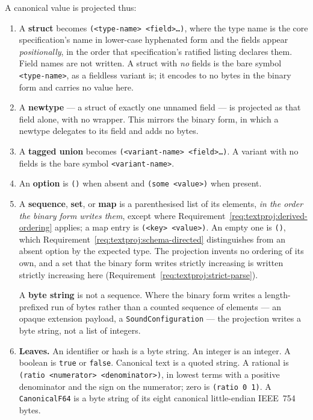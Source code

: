 \documentclass[11pt,letterpaper]{report}
\newcounter{requirement}[chapter]
\begin{document}
\begin{requirement}
  \label{req:textproj:value-projection}
  A canonical value is projected thus:

  \begin{enumerate}
    \item A \textbf{struct} becomes \texttt{(<type-name> <field>\ldots)}, where
      the type name is the core specification's name in lower-case
      hyphenated form and the fields appear \emph{positionally}, in the order
      that specification's ratified listing declares them. Field names are not
      written. A struct with \emph{no} fields is the bare symbol
      \texttt{<type-name>}, as a fieldless variant is; it encodes to no bytes in
      the binary form and carries no value here.
    \item A \textbf{newtype} --- a struct of exactly one unnamed field ---
      is projected as that field alone, with no wrapper. This mirrors the binary
      form, in which a newtype delegates to its field and adds no bytes.
    \item A \textbf{tagged union} becomes
      \texttt{(<variant-name> <field>\ldots)}. A variant with no fields is the
      bare symbol \texttt{<variant-name>}.
    \item An \textbf{option} is \texttt{()} when absent and
      \texttt{(some <value>)} when present.
    \item A \textbf{sequence}, \textbf{set}, or \textbf{map} is a parenthesised
      list of its elements, \emph{in the order the binary form writes them},
      except where Requirement~\ref{req:textproj:derived-ordering} applies; a
      map entry is \texttt{(<key> <value>)}. An empty one is \texttt{()}, which
      Requirement~\ref{req:textproj:schema-directed} distinguishes from an absent
      option by the expected type. The projection invents no ordering of its own,
      and a set that the binary form writes strictly increasing is written
      strictly increasing here
      (Requirement~\ref{req:textproj:strict-parse}).

      A \textbf{byte string} is not a sequence. Where the binary form writes a
      length-prefixed run of bytes rather than a counted sequence of elements ---
      an opaque extension payload, a \texttt{SoundConfiguration} --- the
      projection writes a byte string, not a list of integers.
    \item \textbf{Leaves.} An identifier or hash is a byte string. An integer is
      an integer. A boolean is \texttt{true} or \texttt{false}. Canonical text is
      a quoted string. A rational is \texttt{(ratio <numerator> <denominator>)},
      in lowest terms with a positive denominator and the sign on the numerator;
      zero is \texttt{(ratio 0 1)}. A \texttt{CanonicalF64} is a byte string of
      its eight canonical little-endian IEEE~754 bytes.
  \end{enumerate}
\end{requirement}
\end{document}
